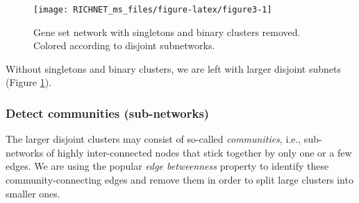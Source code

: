 \documentclass[9pt,a4paper,]{extarticle}
\newenvironment{Shaded}{\begin{snugshade}}{\end{snugshade}}
\newcommand{\KeywordTok}[1]{\textcolor[rgb]{0.13,0.29,0.53}{\textbf{#1}}}
\newcommand{\DataTypeTok}[1]{\textcolor[rgb]{0.13,0.29,0.53}{#1}}
\newcommand{\DecValTok}[1]{\textcolor[rgb]{0.00,0.00,0.81}{#1}}
\newcommand{\StringTok}[1]{\textcolor[rgb]{0.31,0.60,0.02}{#1}}
\newcommand{\OperatorTok}[1]{\textcolor[rgb]{0.81,0.36,0.00}{\textbf{#1}}}
\newcommand{\NormalTok}[1]{#1}
\theoremstyle{definition}
\theoremstyle{definition}
\theoremstyle{definition}
\theoremstyle{remark}
\begin{document}
\begin{Shaded}
\end{Shaded}

\begin{figure}

{\centering \texttt{[image: RICHNET\_ms\_files/figure-latex/figure3-1]} 

}

\caption{Gene set network with singletons and binary clusters removed. Colored according to disjoint subnetworks.}\label{fig:figure3}
\end{figure}

Without singletons and binary clusters, we are left with larger disjoint subnets (Figure \ref{fig:figure3}).

\subsubsection{Detect communities (sub-networks)}\label{detect-communities-sub-networks}

The larger disjoint clusters may consist of so-called \emph{communities}, i.e., sub-networks of highly inter-connected nodes that stick together by only one or a few edges. We are using the popular \emph{edge betweenness} property to identify these community-connecting edges and remove them in order to split large clusters into smaller ones.
\end{document}
